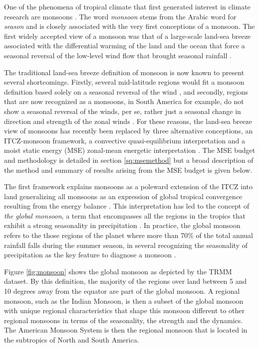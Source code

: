 One of the phenomena of tropical climate that first generated interest in climate research are monsoons \citep{halley}. The word \textit{monsoon} stems from the Arabic word for \textit{season} and is closely associated with the very first conceptions of a monsoon. 
The first widely accepted view of a monsoon was that of a large-scale land-sea breeze associated with the differential warming of the land and the ocean that force a seasonal reversal of the low-level wind flow that brought seasonal rainfall \citep{halley}. 

The traditional land-sea breeze definition of monsoon is now known to present several shortcomings. Firstly, several mid-latitude regions would fit a monsoon definition based solely on a seasonal reversal of the wind \citep{gadgil2018}, and secondly, regions that are now recognized as a monsoons, in South America for example, do not show a seasonal reversal of the winds, per se, rather just a seasonal change in direction and strength of the zonal winds \citep{vera2006}. For these reasons, the land-sea breeze view of monsoons has recently been replaced by three alternative conceptions, an ITCZ-monsoon framework, a convective quasi-equilibrium interpretation and a moist static energy (MSE) zonal-mean energetic interpretation \citep{biasutti2018global,hill2019,geen2020}. 
The MSE budget and methodology is detailed in section \ref{sq:msemethod} but a broad description of the method and summary of results arising from the MSE budget is given below.

The first framework  explains monsoons as a poleward extension of the ITCZ into land  generalizing all monsoons as an expression of global tropical convergence resulting from the energy balance \citep{chao2001origin,gadgil2018}. This interpretation has led to the concept of \textit{the global monsoon}, a term that encompasses all the regions in the tropics that exhibit a strong seasonality in precipitation \citep{zhou2016,gadgil2018}. 
In practice, the global monsoon refers to the those regions of the planet where more than 70\% of the total annual rainfall falls during the summer season, in several recognizing the seasonality of precipitation as the key feature to diagnose a monsoon \citep{zhou2016,wang2017}.

Figure \ref{fig:monsoon} shows the global monsoon as depicted by the TRMM dataset. By this definition, the majority of the regions over land between 5 and 10 degrees away from the equator are part of the global monsoon.
A regional monsoon, such as the Indian Monsoon, is then a subset of the global monsoon with unique regional characteristics that shape this monsoon different to other regional monsoons in terms of the seasonality, the strength and the dynamics. 
The American Monsoon System is then the regional monsoon that is located in the subtropics of North and South America. 


